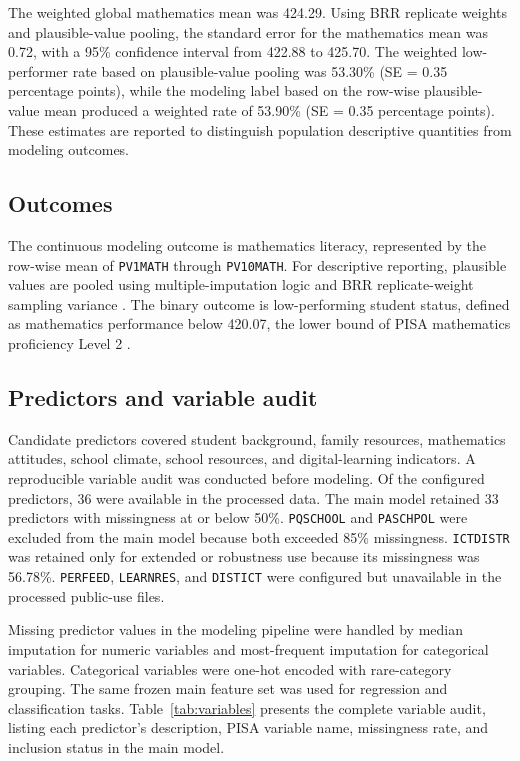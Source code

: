 \documentclass[pdflatex,sn-mathphys-ay]{sn-jnl}
\begin{document}
The weighted global mathematics mean was 424.29. Using BRR replicate weights and plausible-value pooling, the standard error for the mathematics mean was 0.72, with a 95\% confidence interval from 422.88 to 425.70. The weighted low-performer rate based on plausible-value pooling was 53.30\% (SE = 0.35 percentage points), while the modeling label based on the row-wise plausible-value mean produced a weighted rate of 53.90\% (SE = 0.35 percentage points). These estimates are reported to distinguish population descriptive quantities from modeling outcomes.

\FloatBarrier
\subsection{Outcomes}

The continuous modeling outcome is mathematics literacy, represented by the row-wise mean of \texttt{PV1MATH} through \texttt{PV10MATH}. For descriptive reporting, plausible values are pooled using multiple-imputation logic and BRR replicate-weight sampling variance \citep{OECD_2022_technical}. The binary outcome is low-performing student status, defined as mathematics performance below 420.07, the lower bound of PISA mathematics proficiency Level 2 \citep{NCES_2022_cut_scores}.

\FloatBarrier
\subsection{Predictors and variable audit}

Candidate predictors covered student background, family resources, mathematics attitudes, school climate, school resources, and digital-learning indicators. A reproducible variable audit was conducted before modeling. Of the configured predictors, 36 were available in the processed data. The main model retained 33 predictors with missingness at or below 50\%. \texttt{PQSCHOOL} and \texttt{PASCHPOL} were excluded from the main model because both exceeded 85\% missingness. \texttt{ICTDISTR} was retained only for extended or robustness use because its missingness was 56.78\%. \texttt{PERFEED}, \texttt{LEARNRES}, and \texttt{DISTICT} were configured but unavailable in the processed public-use files.

Missing predictor values in the modeling pipeline were handled by median imputation for numeric variables and most-frequent imputation for categorical variables. Categorical variables were one-hot encoded with rare-category grouping. The same frozen main feature set was used for regression and classification tasks. Table~\ref{tab:variables} presents the complete variable audit, listing each predictor's description, PISA variable name, missingness rate, and inclusion status in the main model.
\end{document}
